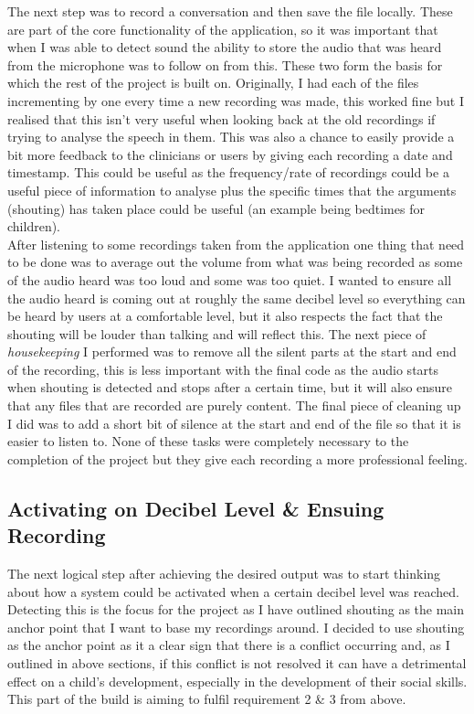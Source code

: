\documentclass[a4paper,11pt]{report}
\begin{document}
The next step was to record a conversation and then save the file locally. These are part of the core functionality of the application, so it was important that when I was able to detect sound the ability to store the audio that was heard from the microphone was to follow on from this. These two form the basis for which the rest of the project is built on. Originally, I had each of the files incrementing by one every time a new recording was made, this worked fine but I realised that this isn’t very useful when looking back at the old recordings if trying to analyse the speech in them. This was also a chance to easily provide a bit more feedback to the clinicians or users by giving each recording a date and timestamp. This could be useful as the frequency/rate of recordings could be a useful piece of information to analyse plus the specific times that the arguments (shouting) has taken place could be useful (an example being bedtimes for children).\\

After listening to some recordings taken from the application one thing that need to be done was to average out the volume from what was being recorded as some of the audio heard was too loud and some was too quiet. I wanted to ensure all the audio heard is coming out at roughly the same decibel level so everything can be heard by users at a comfortable level, but it also respects the fact that the shouting will be louder than talking and will reflect this. The next piece of \textit{housekeeping} I performed was to remove all the silent parts at the start and end of the recording, this is less important with the final code as the audio starts when shouting is detected and stops after a certain time, but it will also ensure that any files that are recorded are purely content. The final piece of cleaning up I did was to add a short bit of silence at the start and end of the file so that it is easier to listen to. None of these tasks were completely necessary to the completion of the project but they give each recording a more professional feeling.

\subsection{Activating on Decibel Level \& Ensuing Recording}
The next logical step after achieving the desired output was to start thinking about how a system could be activated when a certain decibel level was reached. Detecting this is the focus for the project as I have outlined shouting as the main anchor point that I want to base my recordings around. I decided to use shouting as the anchor point as it a clear sign that there is a conflict occurring and, as I outlined in above sections, if this conflict is not resolved it can have a detrimental effect on a child’s development, especially in the development of their social skills. This part of the build is aiming to fulfil requirement 2 \& 3 from above.\\
\end{document}
